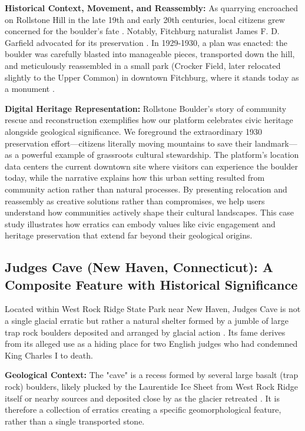 \textbf{Historical Context, Movement, and Reassembly:} As quarrying encroached on Rollstone Hill in the late 19th and early 20th centuries, local citizens grew concerned for the boulder's fate \cite{googleLewistonEvening, telegramWorcesterCounty}. Notably, Fitchburg naturalist James F. D. Garfield advocated for its preservation \cite{googleLewistonEvening}. In 1929-1930, a plan was enacted: the boulder was carefully blasted into manageable pieces, transported down the hill, and meticulously reassembled in a small park (Crocker Field, later relocated slightly to the Upper Common) in downtown Fitchburg, where it stands today as a monument \cite{googleLewistonEvening, telegramWorcesterCounty}.

\textbf{Digital Heritage Representation:} Rollstone Boulder's story of community rescue and reconstruction exemplifies how our platform celebrates civic heritage alongside geological significance. We foreground the extraordinary 1930 preservation effort—citizens literally moving mountains to save their landmark—as a powerful example of grassroots cultural stewardship. The platform's location data centers the current downtown site where visitors can experience the boulder today, while the narrative explains how this urban setting resulted from community action rather than natural processes. By presenting relocation and reassembly as creative solutions rather than compromises, we help users understand how communities actively shape their cultural landscapes. This case study illustrates how erratics can embody values like civic engagement and heritage preservation that extend far beyond their geological origins.

\subsection{Judges Cave (New Haven, Connecticut): A Composite Feature with Historical Significance}
\label{subsec:judges_cave}

Located within West Rock Ridge State Park near New Haven, Judges Cave is not a single glacial erratic but rather a natural shelter formed by a jumble of large trap rock boulders deposited and arranged by glacial action \cite{Dana1891, Stiles1794}. Its fame derives from its alleged use as a hiding place for two English judges who had condemned King Charles I to death.

\textbf{Geological Context:} The "cave" is a recess formed by several large basalt (trap rock) boulders, likely plucked by the Laurentide Ice Sheet from West Rock Ridge itself or nearby sources and deposited close by as the glacier retreated \cite{Dana1891, Rice1906}. It is therefore a collection of erratics creating a specific geomorphological feature, rather than a single transported stone.

